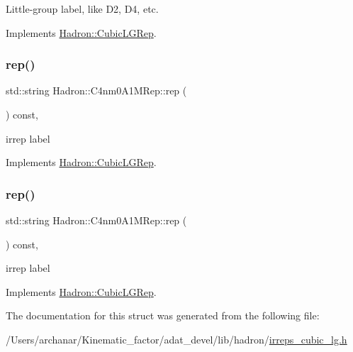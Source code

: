 Little-\/group label, like D2, D4, etc. 

Implements \mbox{\hyperlink{structHadron_1_1CubicLGRep_a9bdb14b519a611d21379ed96a3a9eb41}{Hadron\+::\+Cubic\+L\+G\+Rep}}.

\mbox{\label{structHadron_1_1C4nm0A1MRep_aca630b917cc8bdae915cc1ba072b9166}} 
\subsubsection{\texorpdfstring{rep()}{rep()}\hspace{0.1cm}{\footnotesize\ttfamily [1/2]}}
{\footnotesize\ttfamily std\+::string Hadron\+::\+C4nm0\+A1\+M\+Rep\+::rep (\begin{DoxyParamCaption}{ }\end{DoxyParamCaption}) const\hspace{0.3cm}{\ttfamily [inline]}, {\ttfamily [virtual]}}

irrep label 

Implements \mbox{\hyperlink{structHadron_1_1CubicLGRep_a50f5ddbb8f4be4cee0106fa9e8c75e6c}{Hadron\+::\+Cubic\+L\+G\+Rep}}.

\mbox{\label{structHadron_1_1C4nm0A1MRep_aca630b917cc8bdae915cc1ba072b9166}} 
\subsubsection{\texorpdfstring{rep()}{rep()}\hspace{0.1cm}{\footnotesize\ttfamily [2/2]}}
{\footnotesize\ttfamily std\+::string Hadron\+::\+C4nm0\+A1\+M\+Rep\+::rep (\begin{DoxyParamCaption}{ }\end{DoxyParamCaption}) const\hspace{0.3cm}{\ttfamily [inline]}, {\ttfamily [virtual]}}

irrep label 

Implements \mbox{\hyperlink{structHadron_1_1CubicLGRep_a50f5ddbb8f4be4cee0106fa9e8c75e6c}{Hadron\+::\+Cubic\+L\+G\+Rep}}.



The documentation for this struct was generated from the following file\+:\begin{DoxyCompactItemize}
\item 
/\+Users/archanar/\+Kinematic\+\_\+factor/adat\+\_\+devel/lib/hadron/\mbox{\hyperlink{lib_2hadron_2irreps__cubic__lg_8h}{irreps\+\_\+cubic\+\_\+lg.\+h}}\end{DoxyCompactItemize}
